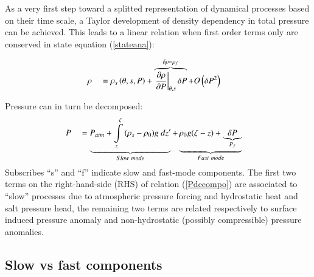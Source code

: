 \documentclass[a4paper,11pt]{article}
\begin{document}
As a very first step toward a splitted representation of dynamical processes based on their time scale, a Taylor development of density dependency in total pressure can be achieved. This leads to a linear relation when first order terms only are conserved in state equation
 (\ref{stateana}):
 
  \begin{alignat}{2}
  \label{rhodecompo}
  \displaystyle
  &\rho &&=\rho_{s}\left(\theta,s,P\right)
  +\overbrace{\left.{\frac{\partial{\rho}}{\partial{P}}}\right|_{\theta,s}\delta{P}}^{\delta{\rho}=\rho_{f}}
  +O\left(\delta{P}^2\right)
  \end{alignat}
  
  Pressure can in turn be decomposed:
  \begin{alignat}{2}
  \label{Pdecompo}
  \displaystyle
  &P &&=\underbrace{P_{atm}
  +\int\limits_z^{\zeta}{(\rho_{s}-\rho_0)g\ dz'}}_{Slow\ mode}
  +\underbrace{\rho_{0}g(\zeta-z)+\underbrace{\delta P}_{P_{f}}}_{Fast\ mode}
  \end{alignat}  
   Subscribes ``s'' and ``f'' indicate slow and fast-mode components. The first two terms on the right-hand-side (RHS) of relation (\ref{Pdecompo}) are associated to ``slow'' processes due to atmospheric pressure forcing and hydrostatic heat and salt pressure head, the remaining two terms are related respectively to surface induced pressure anomaly and non-hydrostatic (possibly compressible) pressure anomalies.
  
 \subsection{Slow vs fast components}
 
\end{document}
